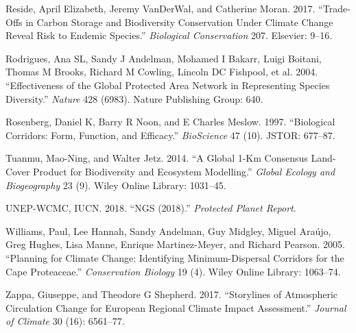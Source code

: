 \documentclass[]{article}
\begin{document}
\leavevmode\hypertarget{ref-reside2017trade}{}%
Reside, April Elizabeth, Jeremy VanDerWal, and Catherine Moran. 2017. ``Trade-Offs in Carbon Storage and Biodiversity Conservation Under Climate Change Reveal Risk to Endemic Species.'' \emph{Biological Conservation} 207. Elsevier: 9--16.

\leavevmode\hypertarget{ref-rodrigues2004effectiveness}{}%
Rodrigues, Ana SL, Sandy J Andelman, Mohamed I Bakarr, Luigi Boitani, Thomas M Brooks, Richard M Cowling, Lincoln DC Fishpool, et al. 2004. ``Effectiveness of the Global Protected Area Network in Representing Species Diversity.'' \emph{Nature} 428 (6983). Nature Publishing Group: 640.

\leavevmode\hypertarget{ref-rosenberg1997biological}{}%
Rosenberg, Daniel K, Barry R Noon, and E Charles Meslow. 1997. ``Biological Corridors: Form, Function, and Efficacy.'' \emph{BioScience} 47 (10). JSTOR: 677--87.

\leavevmode\hypertarget{ref-tuanmu2014global}{}%
Tuanmu, Mao-Ning, and Walter Jetz. 2014. ``A Global 1-Km Consensus Land-Cover Product for Biodiversity and Ecosystem Modelling.'' \emph{Global Ecology and Biogeography} 23 (9). Wiley Online Library: 1031--45.

\leavevmode\hypertarget{ref-unep2018ngs}{}%
UNEP-WCMC, IUCN. 2018. ``NGS (2018).'' \emph{Protected Planet Report}.

\leavevmode\hypertarget{ref-williams2005planning}{}%
Williams, Paul, Lee Hannah, Sandy Andelman, Guy Midgley, Miguel Araújo, Greg Hughes, Lisa Manne, Enrique Martinez-Meyer, and Richard Pearson. 2005. ``Planning for Climate Change: Identifying Minimum-Dispersal Corridors for the Cape Proteaceae.'' \emph{Conservation Biology} 19 (4). Wiley Online Library: 1063--74.

\leavevmode\hypertarget{ref-zappa2017storylines}{}%
Zappa, Giuseppe, and Theodore G Shepherd. 2017. ``Storylines of Atmospheric Circulation Change for European Regional Climate Impact Assessment.'' \emph{Journal of Climate} 30 (16): 6561--77.
\end{document}
